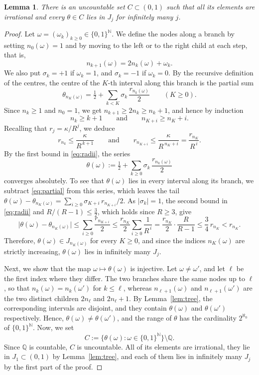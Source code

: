 \documentclass[11pt,reqno]{amsart}
\newtheorem{lemma}[theorem]{Lemma}
\theoremstyle{definition}
\theoremstyle{remark}
\numberwithin{equation}{section}
\newcommand{\Q}{\mathbb{Q}}
\newcommand{\N}{\mathbb{N}}
\begin{document}
\begin{lemma}\label{lem:cantor}
There is an uncountable set $C\subset(0,1)$ such that all its elements are irrational and every $\theta\in C$ lies in $J_j$ for infinitely many $j$.
\end{lemma}

\begin{proof}
Let $\omega=(\omega_k)_{k\ge0}\in\{0,1\}^{\N}$. We define the nodes along a branch by setting $n_0(\omega)=1$ and by moving to the left or to the right child at each step, that is,
\[
n_{k+1}(\omega)=2n_k(\omega)+\omega_k .
\]
We also put $\sigma_k=+1$ if $\omega_k=1$, and $\sigma_k=-1$ if $\omega_k=0$. By the recursive definition of the centres, the centre of the $K$-th interval along this branch is the partial sum
\begin{equation}\label{eq:partial}
\theta_{n_K(\omega)}=\tfrac12+\sum_{k<K}\sigma_k\,\frac{r_{n_k(\omega)}}2\qquad(K\ge0).
\end{equation}
Since $n_k\ge1$ and $n_0=1$, we get $n_{k+1}\ge2n_k\ge n_k+1$, and hence by induction
\[
n_k\ge k+1\qquad\text{and}\qquad n_{K+i}\ge n_K+i .
\]
Recalling that $r_j=\kappa/R^j$, we deduce
\begin{equation}\label{eq:radii}
r_{n_k}\le\frac{\kappa}{R^{\,k+1}}\qquad\text{and}\qquad r_{n_{K+i}}\le\frac{\kappa}{R^{\,n_K+i}}=\frac{r_{n_K}}{R^{\,i}}.
\end{equation}
By the first bound in \eqref{eq:radii}, the series
\[
\theta(\omega):=\tfrac12+\sum_{k\ge0}\sigma_k\,\frac{r_{n_k(\omega)}}2
\]
converges absolutely. To see that $\theta(\omega)$ lies in every interval along its branch, we subtract \eqref{eq:partial} from this series, which leaves the tail $\theta(\omega)-\theta_{n_K(\omega)}=\sum_{i\ge0}\sigma_{K+i}\,r_{n_{K+i}}/2$. As $|\sigma_k|=1$, the second bound in \eqref{eq:radii} and $R/(R-1)\le\tfrac32$, which holds since $R\ge3$, give
\[
\bigl|\theta(\omega)-\theta_{n_K(\omega)}\bigr|\le\sum_{i\ge0}\frac{r_{n_{K+i}}}2\le\frac{r_{n_K}}2\sum_{i\ge0}\frac1{R^{\,i}}=\frac{r_{n_K}}2\cdot\frac{R}{R-1}\le\frac34\,r_{n_K}<r_{n_K}.
\]
Therefore, $\theta(\omega)\in J_{n_K(\omega)}$ for every $K\ge0$, and since the indices $n_K(\omega)$ are strictly increasing, $\theta(\omega)$ lies in infinitely many $J_j$.

Next, we show that the map $\omega\mapsto\theta(\omega)$ is injective. Let $\omega\ne\omega'$, and let $\ell$ be the first index where they differ. The two branches share the same nodes up to $\ell$, so that $n_k(\omega)=n_k(\omega')$ for $k\le\ell$, whereas $n_{\ell+1}(\omega)$ and $n_{\ell+1}(\omega')$ are the two distinct children $2n_\ell$ and $2n_\ell+1$. By Lemma~\ref{lem:tree}, the corresponding intervals are disjoint, and they contain $\theta(\omega)$ and $\theta(\omega')$ respectively. Hence, $\theta(\omega)\ne\theta(\omega')$, and the range of $\theta$ has the cardinality $2^{\aleph_0}$ of $\{0,1\}^{\N}$. Now, we set
\[
C:=\bigl\{\theta(\omega):\omega\in\{0,1\}^{\N}\bigr\}\setminus\Q.
\]
Since $\Q$ is countable, $C$ is uncountable. All of its elements are irrational, they lie in $J_1\subset(0,1)$ by Lemma~\ref{lem:tree}, and each of them lies in infinitely many $J_j$ by the first part of the proof.
\end{proof}
\end{document}
